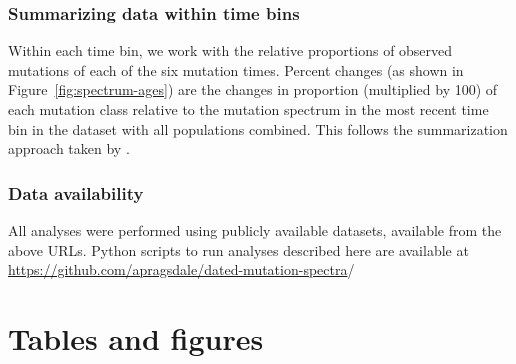 \documentclass[]{article}
\begin{document}
\subsubsection*{Summarizing data within time bins}

Within each time bin, we work with the relative proportions of observed
mutations of each of the six mutation times. Percent changes (as shown in
Figure~\ref{fig:spectrum-ages}) are the changes in proportion (multiplied
by 100) of each mutation class relative to the mutation spectrum in the
most recent time bin in the dataset with all populations combined. This
follows the summarization approach taken by \citet{wang2023human}.

\subsubsection*{Data availability}

All analyses were performed using publicly available datasets, available from
the above URLs. Python scripts to run analyses described here are available at
\url{https://github.com/apragsdale/dated-mutation-spectra}/




\clearpage

\section*{Tables and figures}
\end{document}
